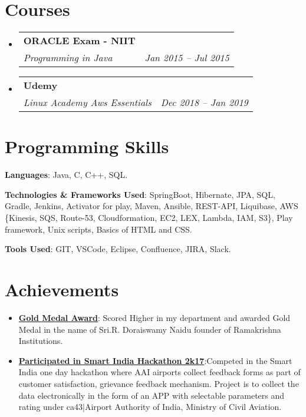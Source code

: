 \documentclass[letterpaper,12pt]{article}
\makeatletter
\newcommand{\resumeItem}[2]{
  \item\small{
    \textbf{#1}{:#2 \vspace{-4pt}}
  }
}
\newcommand{\resumeSubheading}[4]{
  \vspace{-1pt}\item
    \begin{tabular*}{0.97\textwidth}{l@{\extracolsep{\fill}}r}
      \textbf{#1} & #2 \\
      \textit{\small#3} & \textit{\small #4} \\
    \end{tabular*}\vspace{-5pt}
}
\newcommand{\resumeSubItem}[2]{\resumeItem{#1}{#2}\vspace{-4pt}}
\newcommand{\resumeSubHeadingListStart}{\begin{itemize}[leftmargin=*]}
\newcommand{\resumeSubHeadingListEnd}{\end{itemize}}
\makeatother
\begin{document}
\section{Courses}
  \resumeSubHeadingListStart
  \resumeSubheading
      {ORACLE Exam - NIIT}{}
      {Programming in Java}{Jan 2015 -- Jul 2015}
  \resumeSubHeadingListEnd

  \resumeSubHeadingListStart
    \resumeSubheading
      {Udemy}{}
      {Linux Academy Aws Essentials}{Dec 2018 -- Jan 2019}
  \resumeSubHeadingListEnd
  

\section{Programming Skills}
  \resumeSubHeadingListStart
    \item{
      \textbf{Languages}{: Java, C, C++, SQL.}
    \item
      \textbf{Technologies \& Frameworks Used}{: SpringBoot, Hibernate, JPA, SQL, Gradle, Jenkins, Activator for play, Maven, Ansible, REST-API, Liquibase, AWS \{Kinesis, SQS, Route-53, Cloudformation, EC2, LEX, Lambda, IAM, S3\}, Play framework, Unix scripts, Basics of HTML and CSS.}

    \item
      \textbf{Tools Used}{: GIT, VSCode, Eclipse, Confluence, JIRA, Slack.}

    }
  \resumeSubHeadingListEnd



\section{Achievements}
  \resumeSubHeadingListStart
    \resumeSubItem {\href{https://drive.google.com/file/d/0ByYNj-1udG4iTFU4czFnWGo1b2M/view}{Gold Medal Award}}
      { Scored Higher in my department and awarded Gold Medal in the name of Sri.R. Doraiswamy Naidu founder of Ramakrishna Institutions.}
    \resumeSubItem{\href{https://drive.google.com/file/d/0B1MYSgkEaqi2TU04RUtzTWp4bHVQMndlY1M4alZ1T1F3TzJF/view?usp=sharing}{Participated in Smart India Hackathon 2k17}}{Competed in the Smart India one day hackathon where AAI airports collect feedback forms as part of customer satisfaction, grievance feedback mechanism. Project is to collect the data electronically in the form of an APP with selectable parameters and rating under ca43|Airport Authority of India, Ministry of Civil Aviation.}
    \resumeSubHeadingListEnd
\end{document}
